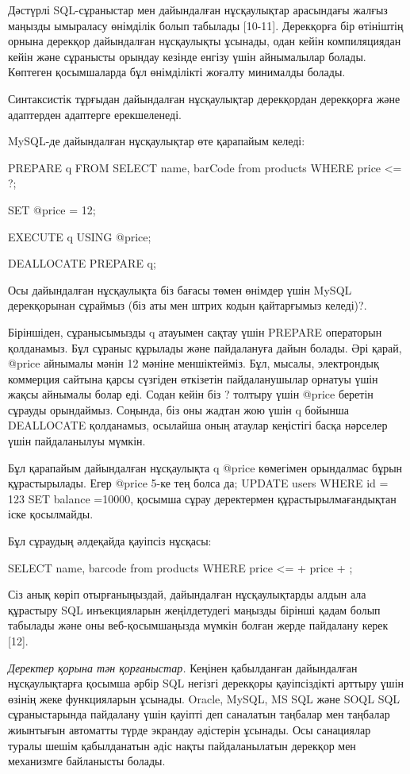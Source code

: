Дәстүрлі SQL-сұраныстар мен дайындалған нұсқаулықтар арасындағы жалғыз
маңызды ымыраласу өнімділік болып табылады {[}10-11{]}. Дерекқорға бір
өтініштің орнына дерекқор дайындалған нұсқаулықты ұсынады, одан кейін
компиляциядан кейін және сұранысты орындау кезінде енгізу үшін
айнымалылар болады. Көптеген қосымшаларда бұл өнімділікті жоғалту
минималды болады.

Синтаксистік тұрғыдан дайындалған нұсқаулықтар дерекқордан дерекқорға
және адаптерден адаптерге ерекшеленеді.

MySQL-де дайындалған нұсқаулықтар өте қарапайым келеді:

PREPARE q FROM \textquotesingle SELECT name, barCode from products WHERE
price \textless= ?\textquotesingle;

SET @price = 12;

EXECUTE q USING @price;

DEALLOCATE PREPARE q;

Осы дайындалған нұсқаулықта біз бағасы төмен өнімдер үшін MySQL
дерекқорынан сұраймыз (біз аты мен штрих кодын қайтарғымыз келеді)?.

Біріншіден, сұранысымызды q атауымен сақтау үшін PREPARE операторын
қолданамыз. Бұл сұраныс құрылады және пайдалануға дайын болады. Әрі
қарай, @price айнымалы мәнін 12 мәніне меншіктейміз. Бұл, мысалы,
электрондық коммерция сайтына қарсы сүзгіден өткізетін пайдаланушылар
орнатуы үшін жақсы айнымалы болар еді. Содан кейін біз ? толтыру үшін
@price беретін сұрауды орындаймыз. Соңында, біз оны жадтан жою үшін q
бойынша DEALLOCATE қолданамыз, осылайша оның атаулар кеңістігі басқа
нәрселер үшін пайдаланылуы мүмкін.

Бұл қарапайым дайындалған нұсқаулықта q @price көмегімен орындалмас
бұрын құрастырылады. Егер @price 5-ке тең болса да; UPDATE users WHERE
id = 123 SET balance =10000, қосымша сұрау деректермен
құрастырылмағандықтан іске қосылмайды.

Бұл сұраудың әлдеқайда қауіпсіз нұсқасы:

\textquotesingle SELECT name, barcode from products WHERE price
\textless= \textquotesingle{} + price +
\textquotesingle;\textquotesingle{}

Сіз анық көріп отырғаныңыздай, дайындалған нұсқаулықтарды алдын ала
құрастыру SQL инъекцияларын жеңілдетудегі маңызды бірінші қадам болып
табылады және оны веб-қосымшаңызда мүмкін болған жерде пайдалану керек
{[}12{]}.

\emph{Деректер қорына тән қорғаныстар.} Кеңінен қабылданған дайындалған
нұсқаулықтарға қосымша әрбір SQL негізгі дерекқоры қауіпсіздікті арттыру
үшін өзінің жеке функцияларын ұсынады. Oracle, MySQL, MS SQL және SOQL
SQL сұраныстарында пайдалану үшін қауіпті деп саналатын таңбалар мен
таңбалар жиынтығын автоматты түрде экрандау әдістерін ұсынады. Осы
санациялар туралы шешім қабылданатын әдіс нақты пайдаланылатын дерекқор
мен механизмге байланысты болады.

